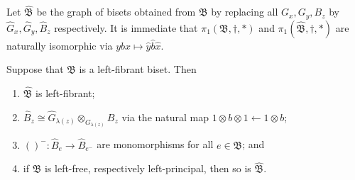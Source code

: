 \documentclass{amsart}
\begin{document}
Let $\widehat{\mathfrak B}$ be the graph of bisets obtained from $\mathfrak
B$ by replacing all $G_x, G_y, B_z$ by $\widehat G_x,\widehat G_y,\widehat
B_z$ respectively.  It is immediate that $\pi_1( { \mathfrak B}, \dagger ,
* )$ and $\pi_1(\widehat{\mathfrak B}, \dagger ,*)$ are naturally
isomorphic via $y b x\mapsto \widehat y\widehat b\widehat x$.
\begin{thm}\label{thm:FaithfGrOfBis}
  Suppose that $\mathfrak B$ is a left-fibrant biset. Then
  \begin{enumerate}
  \item \label{en0:thm:FaithfGrOfBis} $\widehat{\mathfrak B}$ is left-fibrant;
  \item \label{en1:thm:FaithfGrOfBis} $\widehat B_z \cong \widehat
    G_{\lambda(z)} \otimes_{ G_{\lambda(z)}} B_z$ via the natural map
    $1\otimes b\otimes 1 \leftarrow 1 \otimes b$;
  \item \label{en2:thm:FaithfGrOfBis} $()^-\colon\widehat B_e\to\widehat
    B_{e^-}$ are monomorphisms for all $e\in\mathfrak B$; and
  \item \label{en3:thm:FaithfGrOfBis} if $\mathfrak B$ is left-free,
    respectively left-principal, then so is $\widehat{\mathfrak B}$.
\end{enumerate}
\end{thm} 
\end{document}
